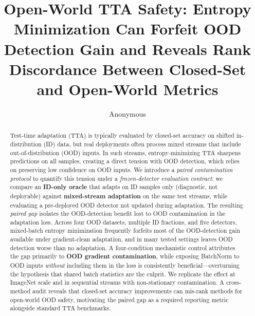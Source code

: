 \documentclass[runningheads]{llncs}
\title{Open-World TTA Safety: Entropy Minimization Can Forfeit OOD Detection Gain and Reveals Rank Discordance Between Closed-Set and Open-World Metrics}
\author{Anonymous}
\institute{Anonymous Institution}
\begin{document}
\maketitle

\begin{abstract}
Test-time adaptation (TTA) is typically evaluated by closed-set accuracy on shifted in-distribution (ID) data, but real deployments often process mixed streams that include out-of-distribution (OOD) inputs.
In such streams, entropy-minimizing TTA sharpens predictions on all samples, creating a direct tension with OOD detection, which relies on preserving low confidence on OOD inputs.
We introduce a \emph{paired contamination protocol} to quantify this tension under a \emph{frozen-detector evaluation contract}: we compare an \textbf{ID-only oracle} that adapts on ID samples only (diagnostic, not deployable) against \textbf{mixed-stream adaptation} on the same test streams, while evaluating a pre-deployed OOD detector not updated during adaptation.
The resulting \emph{paired gap} isolates the OOD-detection benefit lost to OOD contamination in the adaptation loss.
Across four OOD datasets, multiple ID fractions, and five detectors, mixed-batch entropy minimization frequently forfeits most of the OOD-detection gain available under gradient-clean adaptation, and in many tested settings leaves OOD detection worse than no adaptation.
A four-condition mechanistic control attributes the gap primarily to \textbf{OOD gradient contamination}, while exposing BatchNorm to OOD inputs \emph{without} including them in the loss is consistently beneficial---overturning the hypothesis that shared batch statistics are the culprit.
We replicate the effect at ImageNet scale and in sequential streams with non-stationary contamination.
A cross-method audit reveals that closed-set accuracy improvements can mis-rank methods for open-world OOD safety, motivating the paired gap as a required reporting metric alongside standard TTA benchmarks.
\end{abstract}












\appendix

\end{document}
